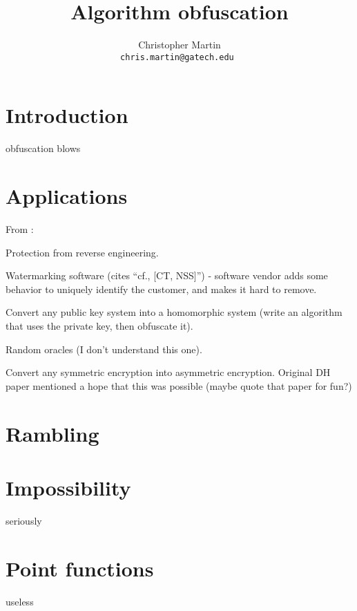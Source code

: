 \documentclass[10pt,twocolumn]{article}
\title{Algorithm obfuscation}
\date{}
\author{
  \begin{tabular}{c c c}
    Christopher Martin \\
    \small \tt{chris.martin@gatech.edu}
  \end{tabular}
}
\begin{document}
\thispagestyle{empty}


\section{Introduction}

obfuscation blows

\section{Applications}

From \cite{onThe(Im)possibility}:

Protection from reverse engineering.

Watermarking software (cites ``cf., [CT, NSS]'') -
software vendor adds some behavior to uniquely identify the
customer, and makes it hard to remove.

Convert any public key system into a homomorphic system
(write an algorithm that uses the private key, then obfuscate it).

Random oracles (I don't understand this one).

Convert any symmetric encryption into asymmetric encryption.
Original DH paper mentioned a hope that this was possible
(maybe quote that paper for fun?)

\section{Rambling}

\section{Impossibility}

seriously

\section{Point functions}

useless



\end{document}
